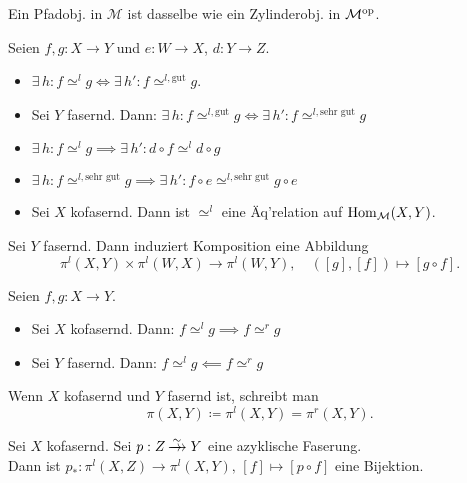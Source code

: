 \documentclass{cheat-sheet}
\newcommand{\nspace}[1]{\foreach \i in {1,...,#1}{ \! }} %
\newcommand{\xtwoheadrightarrow}[1]{\xrightarrow{#1}\nspace{8}\to\,\,} %
\newcommand{\ModC}{\mathcal{M}} %
\newcommand{\gut}{\text{gut}}
\newcommand{\sg}{\text{sehr gut}}
\begin{document}
\begin{bem}
  Ein Pfadobj. in $\ModC$ ist dasselbe wie ein Zylinderobj. in $\ModC^\op$.
\end{bem}


\begin{lem}
  Seien $f, g : X \to Y$ und $e : W \to X$, $d : Y \to Z$.
  \begin{itemize}
    \item $\exists \, h : f \simeq^l g \iff \exists \, h' : f \simeq^{l,\gut} g$.
    \item Sei $Y$ fasernd. Dann: $\exists \, h : f \simeq^{l,\gut} g \iff \exists \, h' : f \simeq^{l,\sg} g$
    \item $\exists \, h : f \simeq^l g \implies \exists \, h' : d \circ f \simeq^l d \circ g$
    \item $\exists \, h : f \simeq^{l,\sg} g \implies \exists \, h' : f \circ e \simeq^{l,\sg} g \circ e$
    \item Sei $X$ kofasernd. Dann ist $\simeq^l$ eine Äq'relation auf $\Hom_\ModC(X, Y)$.
  \end{itemize}
\end{lem}

\begin{kor}
  Sei $Y$ fasernd. Dann induziert Komposition eine Abbildung
  \[
    \pi^l(X, Y) \times \pi^l(W, X) \to \pi^l(W, Y), \quad
    ([g], [f]) \mapsto [g \circ f].
  \]
\end{kor}

\begin{prop}
  Seien $f, g : X \to Y$.
  \begin{itemize}
    \item Sei $X$ kofasernd. Dann: $f \simeq^l g \implies f \simeq^r g$
    \item Sei $Y$ fasernd.\phantom{ko} Dann: $f \simeq^l g \impliedby f \simeq^r g$
  \end{itemize}
\end{prop}

\begin{nota}
  Wenn $X$ kofasernd und $Y$ fasernd ist, schreibt man
  \[ \pi(X, Y) \coloneqq \pi^l(X, Y) = \pi^r(X, Y). \]
\end{nota}

\begin{thm}
  Sei $X$ kofasernd. Sei $p : Z \xtwoheadrightarrow{\sim} Y$ eine azyklische Faserung. \\
  Dann ist $p_* : \pi^l(X, Z) \to \pi^l(X, Y), \, [f] \mapsto [p \circ f]$ eine Bijektion.
\end{thm}
\end{document}
